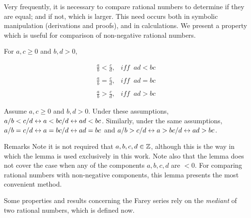 Very frequently, it is necessary to compare rational numbers
to determine if they are equal; and if not, which is larger.
This need occurs both in symbolic manipulation (derivations and
proofs), and in calculations.  We present a property which is
useful for comparison of non-negative rational numbers.

\begin{vworklemmastatement}
\label{lem:cfry0:spfs:02b}
For $a,c \geq 0$ and $b,d > 0$,

\begin{equation}
\begin{array}{lr}
\displaystyle{\frac{a}{b} < \frac{c}{d}},      &  iff \;\; ad < bc             \\
                                               &                               \\
\displaystyle{\frac{a}{b} = \frac{c}{d}},      &  iff \;\; ad = bc             \\
                                               &                               \\
\displaystyle{\frac{a}{b} > \frac{c}{d}},      &  iff \;\; ad > bc             
\end{array}
\end{equation}
\end{vworklemmastatement}
\begin{vworklemmaproof}
Assume $a,c \geq 0$ and $b,d > 0$.
Under these assumptions, $a/b < c/d \leftrightarrow a < bc/d \leftrightarrow ad < bc$.
Similarly, under the same assumptions, 
$a/b = c/d \leftrightarrow a = bc/d \leftrightarrow ad = bc$ and
$a/b > c/d \leftrightarrow a > bc/d \leftrightarrow ad > bc$.
\end{vworklemmaproof}
\begin{vworklemmaparsection}{Remarks}
Note it is not required that
$a, b, c, d \in {\mathbb{Z}}$, although this is the way in which
the lemma is used exclusively in this work.  Note also that the lemma does 
not cover the case when any of the components $a,b,c,d$ are $<0$.
For comparing rational numbers
with non-negative components, this lemma presents
the most convenient method.
\end{vworklemmaparsection}
\vworklemmafooter{}

Some properties and results concerning the Farey series rely
on the \emph{mediant} 
of two rational numbers,
which is defined now.

